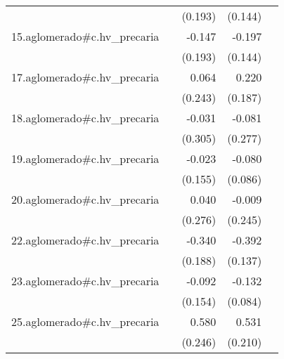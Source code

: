 {\begin{longtable}{l*{4}{D{.}{.}{-1}}}
            &                     &     (0.193)         &     (0.144)         &                     \\
\addlinespace
15.aglomerado#c.hv\_precaria&                     &      -0.147         &      -0.197         &                     \\
            &                     &     (0.193)         &     (0.144)         &                     \\
\addlinespace
17.aglomerado#c.hv\_precaria&                     &       0.064         &       0.220         &                     \\
            &                     &     (0.243)         &     (0.187)         &                     \\
\addlinespace
18.aglomerado#c.hv\_precaria&                     &      -0.031         &      -0.081         &                     \\
            &                     &     (0.305)         &     (0.277)         &                     \\
\addlinespace
19.aglomerado#c.hv\_precaria&                     &      -0.023         &      -0.080         &                     \\
            &                     &     (0.155)         &     (0.086)         &                     \\
\addlinespace
20.aglomerado#c.hv\_precaria&                     &       0.040         &      -0.009         &                     \\
            &                     &     (0.276)         &     (0.245)         &                     \\
\addlinespace
22.aglomerado#c.hv\_precaria&                     &      -0.340         &      -0.392\sym{**} &                     \\
            &                     &     (0.188)         &     (0.137)         &                     \\
\addlinespace
23.aglomerado#c.hv\_precaria&                     &      -0.092         &      -0.132         &                     \\
            &                     &     (0.154)         &     (0.084)         &                     \\
\addlinespace
25.aglomerado#c.hv\_precaria&                     &       0.580\sym{*}  &       0.531\sym{*}  &                     \\
            &                     &     (0.246)         &     (0.210)         &                     \\

\end{longtable}}
